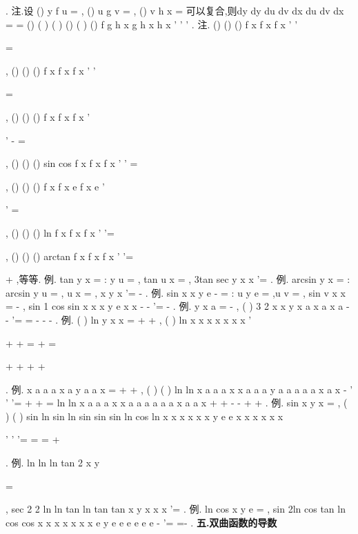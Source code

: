 . 
\textcolor{lyred}{注}.设
()
y
f u
=
,
()
u
g v
=
,
()
v
h x
=
可以复合,则dy
dy du dv
dx
du dv dx
=
\cdots 
\cdots 
= 
()
(
)
(
)
()
(
)
()
f
g h x
g h x
h x
'
'
'
\cdots 
\cdots 
. 
\textcolor{lyred}{注}.
()
()
()
f
x
f x
f
x
'
'

=
\cdots 


,
()
()
()
f
x
f x
f x
'
'

=


,
()
()
()
f
x
f x
f
x
'


'
-
=




, 
()
()
()
sin
cos
f x
f x
f
x
'
'
=
\cdots 




,
()
()
()
f x
f x
e
f
x e
'


'
=


,
()
()
()
ln
f
x
f x
f x
'
'=




, 
()
()
()
arctan
f
x
f x
f
x
'
'=




+
,等等. 
\textcolor{lyred}{例}.
tan
y
x
=
:
y
u
=
,
tan
u
x
=
,
3tan
sec
y
x
x
'=
\cdots 
. 
\textcolor{lyred}{例}.
arcsin
y
x
=
:
arcsin
y
u
=
,
u
x
=
,
x
y
x
'=
-
. 
\textcolor{lyred}{例}.
sin
x
x
y
e
-
=
:
u
y
e
=
,u
v
=
,
sin
v
x
x
=
-
,
sin
1 cos
sin
x
x
x
y
e
x
x
-
-
'=
\cdots 
-
. 
\textcolor{lyred}{例}.
y
x
a
=
-
,
(
)
3 2
x
x
y
x
a
x
a
x
a
-
-
'=
\cdots 
=
-
-
-
. 
\textcolor{lyred}{例}.
(
)
ln
y
x
x
=
+
+
,
(
)
ln
x
x
x
x
x
x
x
'




+
+
=
\cdots 
+
=






+
+
+
+


. 
\textcolor{lyred}{例}.
x
a
a
a
x
a
y
a
a
x
=
+
+
,
(
)
(
)
ln
ln
x
a
a
a
x
x
a
a
a
y
a
a
a
a
a
x
a x
-
'
'
'=
\cdots 
+
\cdots 
+
= 
ln
ln
x
a
a
a
x
x
a
a
a
a
a
a
x
a
a x
+
+
-
-
+
+
. 
\textcolor{lyred}{例}.
sin x
y
x
=
,
(
)
(
)
sin ln
sin ln
sin
sin
sin ln
cos ln
x
x
x
x
x
x
y
e
e
x
x
x
x
x
x


'
'
'=
=
\cdots 
=
+




. 
\textcolor{lyred}{例}.
ln ln ln tan 2
x
y




=








,
sec 2 2
ln ln tan
ln tan
tan
x
y
x
x
x
'=
\cdots 
\cdots 
\cdots 
\cdots 
. 
\textcolor{lyred}{例}.
ln cos
x
y
e
=
,
sin
2ln cos
tan
ln cos
cos
x
x
x
x
x
x
x
e
y
e
e
e
e
e
e
-
'=
\cdots 
\cdots 
\cdots 
=-
\cdots 
. 
\vspace{4pt}
{\bfseries \textcolor{lyred}{五.双曲函数的导数}}

